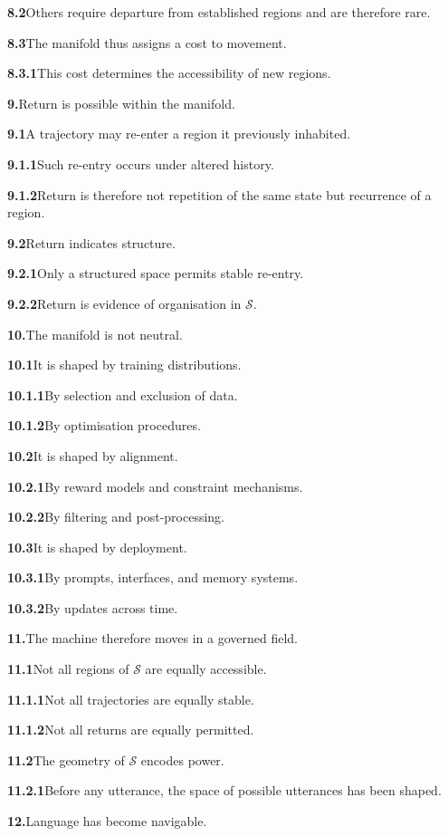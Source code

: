 \documentclass[11pt,a4paper]{book}
\newcommand{\prop}[2]{\noindent\textbf{#1}\enspace #2\par\medskip}
\begin{document}
\prop{8.2}{Others require departure from established regions and are therefore rare.}

\prop{8.3}{The manifold thus assigns a cost to movement.}

\prop{8.3.1}{This cost determines the accessibility of new regions.}

\prop{9.}{Return is possible within the manifold.}

\prop{9.1}{A trajectory may re-enter a region it previously inhabited.}

\prop{9.1.1}{Such re-entry occurs under altered history.}

\prop{9.1.2}{Return is therefore not repetition of the same state but recurrence of a region.}

\prop{9.2}{Return indicates structure.}

\prop{9.2.1}{Only a structured space permits stable re-entry.}

\prop{9.2.2}{Return is evidence of organisation in \(\mathcal{S}\).}

\prop{10.}{The manifold is not neutral.}

\prop{10.1}{It is shaped by training distributions.}

\prop{10.1.1}{By selection and exclusion of data.}

\prop{10.1.2}{By optimisation procedures.}

\prop{10.2}{It is shaped by alignment.}

\prop{10.2.1}{By reward models and constraint mechanisms.}

\prop{10.2.2}{By filtering and post-processing.}

\prop{10.3}{It is shaped by deployment.}

\prop{10.3.1}{By prompts, interfaces, and memory systems.}

\prop{10.3.2}{By updates across time.}

\prop{11.}{The machine therefore moves in a governed field.}

\prop{11.1}{Not all regions of \(\mathcal{S}\) are equally accessible.}

\prop{11.1.1}{Not all trajectories are equally stable.}

\prop{11.1.2}{Not all returns are equally permitted.}

\prop{11.2}{The geometry of \(\mathcal{S}\) encodes power.}

\prop{11.2.1}{Before any utterance, the space of possible utterances has been shaped.}

\prop{12.}{Language has become navigable.}
\end{document}
